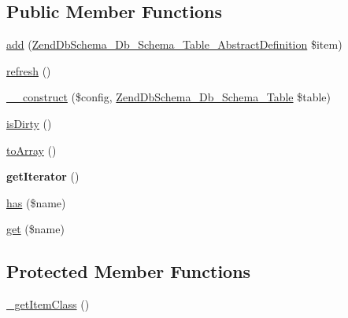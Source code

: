 \subsection*{\-Public \-Member \-Functions}
\begin{DoxyCompactItemize}
\item 
\hyperlink{classZendDbSchema__Db__Schema__Table__Manager__AbstractManager_a9a073bd54ea481e89f7a67f850269c43}{add} (\hyperlink{classZendDbSchema__Db__Schema__Table__AbstractDefinition}{\-Zend\-Db\-Schema\-\_\-\-Db\-\_\-\-Schema\-\_\-\-Table\-\_\-\-Abstract\-Definition} \$item)
\item 
\hyperlink{classZendDbSchema__Db__Schema__Table__Manager__AbstractManager_a2772bff0f798fb0be284a8e92d47a39e}{refresh} ()
\item 
\hyperlink{classZendDbSchema__Db__Schema__Table__Manager__AbstractManager_a5198d6d1091f70119853defc477f9cf2}{\-\_\-\-\_\-construct} (\$config, \hyperlink{classZendDbSchema__Db__Schema__Table}{\-Zend\-Db\-Schema\-\_\-\-Db\-\_\-\-Schema\-\_\-\-Table} \$table)
\item 
\hyperlink{classZendDbSchema__Db__Schema__Table__Manager__AbstractManager_adc9426e5e587801e0c8ac7d32e4486ec}{is\-Dirty} ()
\item 
\hyperlink{classZendDbSchema__Db__Schema__Table__Manager__AbstractManager_a8d9ce9b3b76d2cd0d5f56f931a108f2e}{to\-Array} ()
\item 
\hypertarget{classZendDbSchema__Db__Schema__Table__Manager__AbstractManager_ac1b3d49338cc391bcae4e3b7693d8a4d}{{\bfseries get\-Iterator} ()}\label{classZendDbSchema__Db__Schema__Table__Manager__AbstractManager_ac1b3d49338cc391bcae4e3b7693d8a4d}

\item 
\hyperlink{classZendDbSchema__Db__Schema__Table__Manager__AbstractManager_ac96e8e5950ad6ff3387a51340d17e719}{has} (\$name)
\item 
\hyperlink{classZendDbSchema__Db__Schema__Table__Manager__AbstractManager_a36a5bc23666e2d6ed36cc214826c2739}{get} (\$name)
\end{DoxyCompactItemize}
\subsection*{\-Protected \-Member \-Functions}
\begin{DoxyCompactItemize}
\item 
\hyperlink{classZendDbSchema__Db__Schema__Table__Manager__AbstractManager_a3e39282b74553f4021edf3224450cdd3}{\-\_\-get\-Item\-Class} ()
\end{DoxyCompactItemize}
